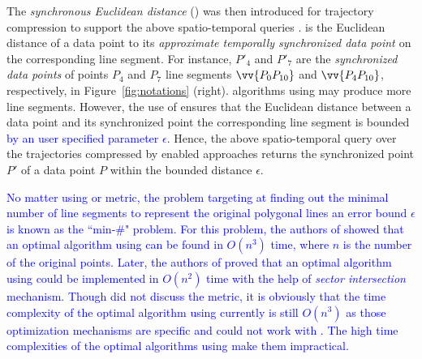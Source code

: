 

The \emph{synchronous Euclidean distance} (\sed) was then introduced for trajectory compression to support the above spatio-temporal queries \cite{Meratnia:Spatiotemporal}. \sed is the Euclidean distance of a data point to its \emph{approximate temporally synchronized data point \cite{Meratnia:Spatiotemporal}} on the corresponding line segment. For instance, $P'_4$ and $P'_7$ are the \emph{synchronized data points} of points $P_4$ and $P_7$ \wrt line segments $\vv{P_0P_{10}}$ and $\vv{P_4P_{10}}$, respectively, in Figure~\ref{fig:notations} (right).
\lsa algorithms using \sed may produce more line segments. However, the use of \sed ensures that the Euclidean distance between a data point and its  synchronized point \wrt the corresponding line segment is bounded \textcolor{blue}{by an user specified parameter $\epsilon$}. Hence, the above spatio-temporal query over the trajectories compressed by \sed enabled approaches returns the synchronized point $P'$ of a data point $P$ within the bounded distance $\epsilon$.


\textcolor{blue}{No matter using \ped or \sed metric, the problem targeting at finding out the minimal number of line segments to represent the original polygonal lines \wrt an error bound $\epsilon$ is known as the ``min-\#" problem\cite{Imai:Optimal,Chan:Optimal}. For this problem, 
	the authors of \cite{Imai:Optimal} showed that an optimal \lsa algorithm using \ped can be found in $O(n^3)$ time, where $n$ is the number of the original points. 
	Later, the authors of \cite{Chan:Optimal} proved that an optimal algorithm using \ped could be implemented in $O(n^2)$ time with the help of \textit{sector intersection} mechanism. 
	Though \cite{Chan:Optimal} did not discuss the \sed metric, it is obviously that the time complexity of the optimal \lsa algorithm using \sed currently is still $O(n^3)$ as those optimization mechanisms are \ped specific and could not work with \sed. 
	The high time complexities of the optimal \lsa algorithms using \sed make them impractical.}


